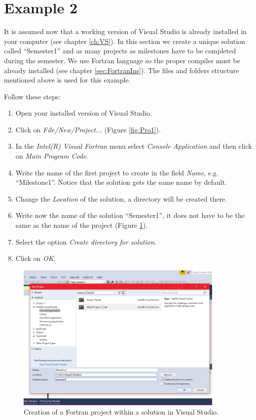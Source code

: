 \FloatBarrier
\section{Example 2} \label{sec:Example2}

It is assumed now that a working version of Visual Studio is already installed in your computer (see chapter \ref{ch:VS}). In this section we create a unique solution called ``Semester1'' and as many projects as milestones have to be completed during the semester. We use Fortran language so the proper compiler must be already installed (see chapter \ref{sec:FortranIns}). The files and folders structure mentioned above is used for this example. 

Follow these steps:

\begin{enumerate}[nosep]
    \item Open your installed version of Visual Studio.
    \item Click on \textit{File/New/Project...} (Figure \ref{fig:Pro1}).
    \item In the \textit{Intel(R) Visual Fortran} menu select \textit{Console Application} and then click on \textit{Main Program Code}.
    \item Write the name of the first project to create in the field \textit{Name}, e.g. ``Milestone1''. Notice that the solution gets the same name by default. 
    \item Change the \textit{Location} of the solution, a directory will be created there.
    \item Write now the name of the solution ``Semester1'', it does not have to be the same as the name of the project (Figure \ref{fig:Intro1}).  
    \item Select the option \textit{Create directory for solution}.
    \item Click on \textit{OK}.
\end{enumerate}

\begin{figure}
    \centering
    \includegraphics[width= 0.9\textwidth]{Figures/Intro1}
    \caption{Creation of a Fortran project within a solution in Visual Studio.}
    \label{fig:Intro1}
\end{figure}

